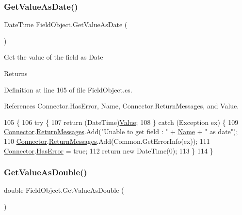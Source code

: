 \subsubsection{\texorpdfstring{Get\+Value\+As\+Date()}{GetValueAsDate()}}
{\footnotesize\ttfamily Date\+Time Field\+Object.\+Get\+Value\+As\+Date (\begin{DoxyParamCaption}{ }\end{DoxyParamCaption})}



Get the value of the field as Date 

\begin{DoxyReturn}{Returns}

\end{DoxyReturn}


Definition at line 105 of file Field\+Object.\+cs.



References Connector.\+Has\+Error, Name, Connector.\+Return\+Messages, and Value.


\begin{DoxyCode}
105                                      \{
106         \textcolor{keywordflow}{try} \{
107             \textcolor{keywordflow}{return} (DateTime)\mbox{\hyperlink{class_field_object_a9764fb1824cec95b82cd6ac0b4cd8919}{Value}};
108         \} \textcolor{keywordflow}{catch} (Exception ex) \{
109             \mbox{\hyperlink{class_connector}{Connector}}.\mbox{\hyperlink{class_connector_a1ed422674b344524fd77998dcf6a9ba6}{ReturnMessages}}.Add(\textcolor{stringliteral}{"Unable to get field : "} + 
      \mbox{\hyperlink{class_field_object_ae5d972e96a3eca93407da8e8a89abfd1}{Name}} + \textcolor{stringliteral}{" as date"});
110             \mbox{\hyperlink{class_connector}{Connector}}.\mbox{\hyperlink{class_connector_a1ed422674b344524fd77998dcf6a9ba6}{ReturnMessages}}.Add(Common.GetErrorInfo(ex));
111             \mbox{\hyperlink{class_connector}{Connector}}.\mbox{\hyperlink{class_connector_a9365777a6b7b711b75bcfa6c4d53e989}{HasError}} = \textcolor{keyword}{true};
112             \textcolor{keywordflow}{return} \textcolor{keyword}{new} DateTime(0);
113         \}
114     \}
\end{DoxyCode}
\mbox{\label{class_field_object_aafe2b7d3e7d414345d85e19dddce3c47}} 
\subsubsection{\texorpdfstring{Get\+Value\+As\+Double()}{GetValueAsDouble()}}
{\footnotesize\ttfamily double Field\+Object.\+Get\+Value\+As\+Double (\begin{DoxyParamCaption}{ }\end{DoxyParamCaption})}



